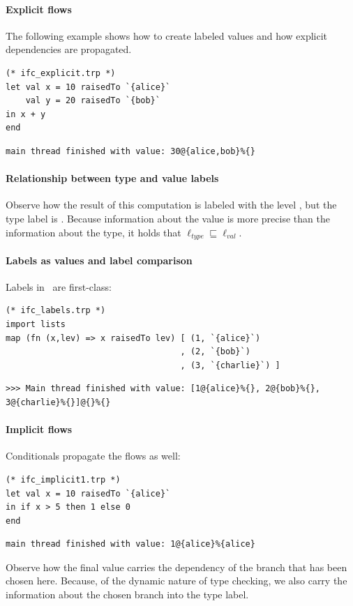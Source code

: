 \paragraph{Explicit flows}
The following example shows how to create labeled values and how explicit dependencies are propagated.
\begin{lstlisting}
(* ifc_explicit.trp *)
let val x = 10 raisedTo `{alice}`
    val y = 20 raisedTo `{bob}`
in x + y
end
\end{lstlisting}
\begin{verbatim}
main thread finished with value: 30@{alice,bob}%{}
\end{verbatim}


\paragraph{Relationship between type and value labels}
Observe how the result of this computation is labeled with
the level , but the type label is \lev{}.
Because information about the value is more precise than the information about the type, it holds that
$\ell_{\mathit{type}} \sqsubseteq \ell_{\mathit{val}}$.


\paragraph{Labels as values and label comparison}
Labels in \troupelang\ are first-class:

\begin{lstlisting}
(* ifc_labels.trp *)
import lists
map (fn (x,lev) => x raisedTo lev) [ (1, `{alice}`)
                                   , (2, `{bob}`)
                                   , (3, `{charlie}`) ]
\end{lstlisting}
\begin{lstlisting}
>>> Main thread finished with value: [1@{alice}%{}, 2@{bob}%{},
3@{charlie}%{}]@{}%{}
\end{lstlisting}


\paragraph{Implicit flows}
Conditionals propagate the flows as well:

\begin{lstlisting}
(* ifc_implicit1.trp *)
let val x = 10 raisedTo `{alice}`
in if x > 5 then 1 else 0
end
\end{lstlisting}
\begin{verbatim}
main thread finished with value: 1@{alice}%{alice}
\end{verbatim}
Observe how the final value carries the dependency of the
branch that has been chosen here. Because, of the dynamic nature of type checking,
we also carry the information about the chosen branch into the type label.


